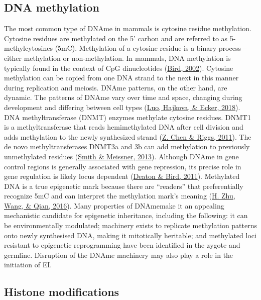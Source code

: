 \documentclass[12pt,twoside]{reedthesis}
\begin{document}
\hypertarget{dna-methylation}{%
\subsection*{DNA methylation}\label{dna-methylation}}

The most common type of DNAme in mammals is cytosine residue
methylation. Cytosine residues are methylated on the 5' carbon and are
referred to as 5-methylcytosines (5mC). Methylation of a cytosine
residue is a binary process -- either methylation or non-methylation. In
mammals, DNA methylation is typically found in the context of CpG
dinucleotides (\protect\hyperlink{ref-bird2002}{Bird, 2002}). Cytosine methylation can be copied from one
DNA strand to the next in this manner during replication and meiosis.
DNAme patterns, on the other hand, are dynamic. The patterns of DNAme
vary over time and space, changing during development and differing
between cell types (\protect\hyperlink{ref-luo2018}{Luo, Hajkova, \& Ecker, 2018}). DNA methyltransferase (DNMT) enzymes
methylate cytosine residues. DNMT1 is a methyltransferase that reads
hemimethylated DNA after cell division and adds methylation to the newly
synthesized strand (\protect\hyperlink{ref-chen2011}{Z. Chen \& Riggs, 2011}). The de novo methyltransferases DNMT3a
and 3b can add methylation to previously unmethylated residues
(\protect\hyperlink{ref-smith2013}{Smith \& Meissner, 2013}). Although DNAme in gene control regions is generally
associated with gene repression, its precise role in gene regulation is
likely locus dependent (\protect\hyperlink{ref-deaton2011}{Deaton \& Bird, 2011}). Methylated DNA is a true
epigenetic mark because there are ``readers'' that preferentially
recognize 5mC and can interpret the methylation mark's meaning
(\protect\hyperlink{ref-zhu2016a}{H. Zhu, Wang, \& Qian, 2016}). Many properties of DNAmemake it an appealing mechanistic
candidate for epigenetic inheritance, including the following: it can be
environmentally modulated; machinery exists to replicate methylation
patterns onto newly synthesised DNA, making it mitotically heritable;
and methylated loci resistant to epigenetic reprogramming have been
identified in the zygote and germline. Disruption of the DNAme machinery
may also play a role in the initiation of EI.

\hypertarget{histone-modifications}{%
\subsection*{Histone modifications}\label{histone-modifications}}
\end{document}
